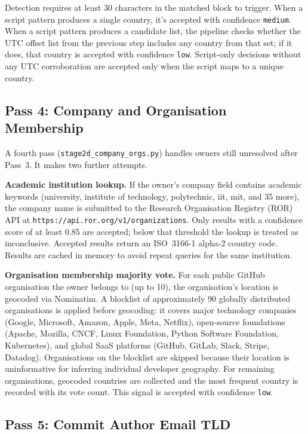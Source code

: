 Detection requires at least 30 characters in the matched block to trigger. When a script pattern produces a single country, it's accepted with confidence \texttt{medium}. When a script pattern produces a candidate list, the pipeline checks whether the UTC offset list from the previous step includes any country from that set; if it does, that country is accepted with confidence \texttt{low}. Script-only decisions without any UTC corroboration are accepted only when the script maps to a unique country.

\subsection{Pass 4: Company and Organisation Membership}

A fourth pass (\texttt{stage2d\_company\_orgs.py}) handles owners still unresolved after Pass~3. It makes two further attempts.

\textbf{Academic institution lookup.} If the owner's company field contains academic keywords (university, institute of technology, polytechnic, iit, mit, and 35 more), the company name is submitted to the Research Organisation Registry (ROR) API at \texttt{https://api.ror.org/v1/organizations}. Only results with a confidence score of at least 0.85 are accepted; below that threshold the lookup is treated as inconclusive. Accepted results return an ISO~3166-1 alpha-2 country code. Results are cached in memory to avoid repeat queries for the same institution.

\textbf{Organisation membership majority vote.} For each public GitHub organisation the owner belongs to (up to 10), the organisation's location is geocoded via Nominatim. A blocklist of approximately 90 globally distributed organisations is applied before geocoding: it covers major technology companies (Google, Microsoft, Amazon, Apple, Meta, Netflix), open-source foundations (Apache, Mozilla, CNCF, Linux Foundation, Python Software Foundation, Kubernetes), and global SaaS platforms (GitHub, GitLab, Slack, Stripe, Datadog). Organisations on the blocklist are skipped because their location is uninformative for inferring individual developer geography. For remaining organisations, geocoded countries are collected and the most frequent country is recorded with its vote count. This signal is accepted with confidence \texttt{low}.

\subsection{Pass 5: Commit Author Email TLD}

